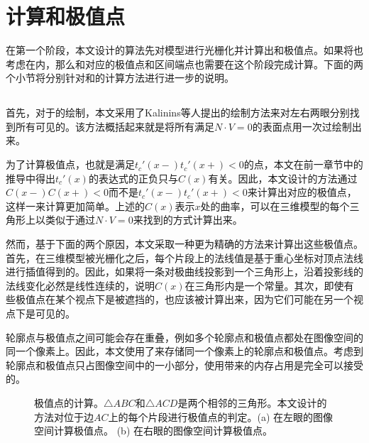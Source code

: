 {\section{计算\conp{}和极值点}

在第一个阶段，本文设计的算法先对模型进行光栅化并计算出\conp{}和极值点。如果将\scon{}也考虑在内，那么\scon{}和对应的极值点和区间端点也需要在这个阶段完成计算。下面的两个小节将分别针对\con{}和\scon{}的计算方法进行进一步的说明。

\subsection{\con{}}

首先，对于\con{}的绘制，本文采用了Kalinins等人提出的绘制方法\cite{wysiwyg2002drawing}来对左右两眼分别找到所有可见的\con{}。该方法概括起来就是将所有满足$N\cdot{V} = 0$的表面点用一次过绘制出来。

为了计算极值点，也就是满足$t_c'(x-)t_c'(x+) < 0$的点，本文在前一章节中的推导中得出$t_c'(x)$的表达式的正负只与$C(x)$有关。因此，本文设计的方法通过$C(x-)C(x+) < 0$而不是$t_c'(x-)t_c'(x+) < 0$来计算出\con{}对应的极值点，这样一来计算更加简单。上述的$C(x)$表示$x$处的曲率，可以在三维模型的每个三角形上以类似于通过$N\cdot{V} = 0$来找到\conp{}的方式计算出来。

然而，基于下面的两个原因，本文采取一种更为精确的方法来计算出这些极值点。首先，在三维模型被光栅化之后，每个片段上的法线值是基于重心坐标对顶点法线进行插值得到的。因此，如果将一条对极曲线投影到一个三角形上，沿着投影线的法线变化必然是线性连续的，说明$C(x)$在三角形内是一个常量。其次，即使有些极值点在某个视点下是被遮挡的，也应该被计算出来，因为它们可能在另一个视点下是可见的。

轮廓点与极值点之间可能会存在重叠，例如多个轮廓点和极值点都处在图像空间的同一个像素上。因此，本文使用了\ppll{}来存储同一个像素上的轮廓点和极值点。考虑到轮廓点和极值点只占图像空间中的一小部分，使用\ppll{}带来的内存占用是完全可以接受的。

\begin{figure}[tbh]
    \centering
    \hfil
    \caption{极值点的计算。$\triangle ABC$和$\triangle ACD$是两个相邻的三角形。本文设计的方法对位于边$AC$上的每个片段进行极值点的判定。(a) 在左眼的图像空间计算极值点。 (b) 在右眼的图像空间计算极值点。} \label{fig:extreme points}
\end{figure}

}
